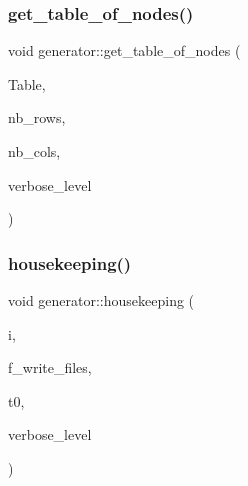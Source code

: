 \subsubsection{\texorpdfstring{get\+\_\+table\+\_\+of\+\_\+nodes()}{get\_table\_of\_nodes()}}
{\footnotesize\ttfamily void generator\+::get\+\_\+table\+\_\+of\+\_\+nodes (\begin{DoxyParamCaption}\item[{\mbox{\hyperlink{galois_8h_a09fddde158a3a20bd2dcadb609de11dc}{I\+NT}} $\ast$\&}]{Table,  }\item[{\mbox{\hyperlink{galois_8h_a09fddde158a3a20bd2dcadb609de11dc}{I\+NT}} \&}]{nb\+\_\+rows,  }\item[{\mbox{\hyperlink{galois_8h_a09fddde158a3a20bd2dcadb609de11dc}{I\+NT}} \&}]{nb\+\_\+cols,  }\item[{\mbox{\hyperlink{galois_8h_a09fddde158a3a20bd2dcadb609de11dc}{I\+NT}}}]{verbose\+\_\+level }\end{DoxyParamCaption})}

\mbox{\label{classgenerator_aaf2bd92e8f74eb9fbc3244a6dde6f78c}} 
\subsubsection{\texorpdfstring{housekeeping()}{housekeeping()}}
{\footnotesize\ttfamily void generator\+::housekeeping (\begin{DoxyParamCaption}\item[{\mbox{\hyperlink{galois_8h_a09fddde158a3a20bd2dcadb609de11dc}{I\+NT}}}]{i,  }\item[{\mbox{\hyperlink{galois_8h_a09fddde158a3a20bd2dcadb609de11dc}{I\+NT}}}]{f\+\_\+write\+\_\+files,  }\item[{\mbox{\hyperlink{galois_8h_a09fddde158a3a20bd2dcadb609de11dc}{I\+NT}}}]{t0,  }\item[{\mbox{\hyperlink{galois_8h_a09fddde158a3a20bd2dcadb609de11dc}{I\+NT}}}]{verbose\+\_\+level }\end{DoxyParamCaption})}

\mbox{\label{classgenerator_a6c09d8dc65abd5c79f3310e8293a56d8}} 
